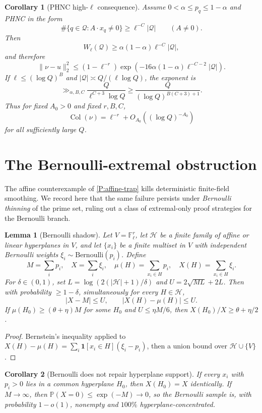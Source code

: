\documentclass[11pt]{article}
\newtheorem{lemma}{Lemma}
\newtheorem{corollary}{Corollary}
\newcommand{\F}{\mathbb F}
\begin{document}
\begin{corollary}[PHNC high-\(\ell\) consequence]\label{C:phnc-high-ell}
Assume \(0<\alpha\le p_q\le1-\alpha\) and PHNC in the form
\[
\#\{q\in\mathcal Q:A\cdot x_q\ne0\}
\ge
\ell^{-C}|\mathcal Q|
\qquad(A\ne0).
\]
Then
\[
W_\ell(\mathcal Q)
\ge
\alpha(1-\alpha)\ell^{-C}|\mathcal Q|,
\]
and therefore
\[
\|\nu-u\|_2^2
\le
(1-\ell^{-r})
\exp\left(
-16\alpha(1-\alpha)\ell^{-C-2}|\mathcal Q|
\right).
\]
If \(\ell\le(\log Q)^B\) and \(|\mathcal Q|\asymp Q/(\ell\log Q)\), the exponent is
\[
\gg_{\alpha,B,C}
\frac{Q}{\ell^{C+3}\log Q}
\ge
\frac{Q}{(\log Q)^{B(C+3)+1}}.
\]
Thus for fixed \(A_0>0\) and fixed \(r,B,C\),
\[
\operatorname{Col}(\nu)=\ell^{-r}+O_{A_0}((\log Q)^{-A_0})
\]
for all sufficiently large \(Q\).
\end{corollary}

\section{The Bernoulli-extremal obstruction}\label{S:bernoulli-extremal}

The affine counterexample of \cref{P:affine-trap} kills deterministic finite-field smoothing.  We record here that the same failure persists under \emph{Bernoulli thinning} of the prime set, ruling out a class of extremal-only proof strategies for the Bernoulli branch.

\begin{lemma}[Bernoulli shadow]\label{L:shadow}
Let \(V=\F_\ell^r\), let \(\mathcal H\) be a finite family of affine or linear hyperplanes in \(V\), and let \(\{x_i\}\) be a finite multiset in \(V\) with independent Bernoulli weights \(\xi_i\sim\mathrm{Bernoulli}(p_i)\).  Define
\[
M=\sum_i p_i,\quad X=\sum_i\xi_i,\quad
\mu(H)=\sum_{x_i\in H}p_i,\quad X(H)=\sum_{x_i\in H}\xi_i.
\]
For \(\delta\in(0,1)\), set \(L=\log(2(|\mathcal H|+1)/\delta)\) and \(U=2\sqrt{ML}+2L\).  Then with probability \(\ge 1-\delta\), simultaneously for every \(H\in\mathcal H\),
\[
|X-M|\le U,\qquad |X(H)-\mu(H)|\le U.
\]
If \(\mu(H_0)\ge(\theta+\eta)M\) for some \(H_0\) and \(U\le\eta M/6\), then \(X(H_0)/X\ge\theta+\eta/2\).
\end{lemma}

\begin{proof}
Bernstein's inequality applied to \(X(H)-\mu(H)=\sum_i\mathbf 1[x_i\in H](\xi_i-p_i)\), then a union bound over \(\mathcal H\cup\{V\}\).
\end{proof}

\begin{corollary}[Bernoulli does not repair hyperplane support]\label{C:bernoulli-no-repair}
If every \(x_i\) with \(p_i>0\) lies in a common hyperplane \(H_0\), then \(X(H_0)=X\) identically.  If \(M\to\infty\), then \(\mathbb P(X=0)\le\exp(-M)\to 0\), so the Bernoulli sample is, with probability \(1-o(1)\), nonempty and \(100\%\) hyperplane-concentrated.
\end{corollary}
\end{document}
